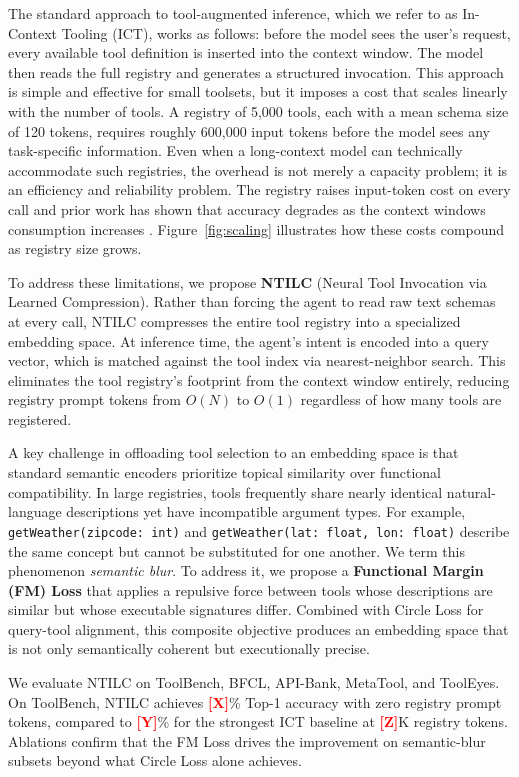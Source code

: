 \documentclass{article}
\newcommand{\placeholder}[1]{\textcolor{red}{\textbf{[#1]}}}
\begin{document}
The standard approach to tool-augmented inference, which we refer to as In-Context Tooling (ICT), works as follows: before the model sees the user's request, every available tool definition is inserted into the context window.
The model then reads the full registry and generates a structured invocation.
This approach is simple and effective for small toolsets, but it imposes a cost that scales linearly with the number of tools.
A registry of 5,000 tools, each with a mean schema size of 120 tokens, requires roughly 600,000 input tokens before the model sees any task-specific information.
Even when a long-context model can technically accommodate such registries, the overhead is not merely a capacity problem; it is an efficiency and reliability problem.
The registry raises input-token cost on every call and prior work has shown that accuracy degrades as the context windows consumption increases \cite{liu2023lostmiddlelanguagemodels}.
Figure~\ref{fig:scaling} illustrates how these costs compound as registry size grows.

To address these limitations, we propose \textbf{NTILC} (Neural Tool Invocation via Learned Compression).
Rather than forcing the agent to read raw text schemas at every call, NTILC compresses the entire tool registry into a specialized embedding space.
At inference time, the agent's intent is encoded into a query vector, which is matched against the tool index via nearest-neighbor search.
This eliminates the tool registry's footprint from the context window entirely, reducing registry prompt tokens from $O(N)$ to $O(1)$ regardless of how many tools are registered.

A key challenge in offloading tool selection to an embedding space is that standard semantic encoders prioritize topical similarity over functional compatibility.
In large registries, tools frequently share nearly identical natural-language descriptions yet have incompatible argument types.
For example, \texttt{getWeather(zipcode: int)} and \texttt{getWeather(lat: float, lon: float)} describe the same concept but cannot be substituted for one another.
We term this phenomenon \textit{semantic blur}.
To address it, we propose a \textbf{Functional Margin (FM) Loss} that applies a repulsive force between tools whose descriptions are similar but whose executable signatures differ.
Combined with Circle Loss for query-tool alignment, this composite objective produces an embedding space that is not only semantically coherent but executionally precise.

We evaluate NTILC on ToolBench, BFCL, API-Bank, MetaTool, and ToolEyes.
On ToolBench, NTILC achieves \placeholder{X}\% Top-1 accuracy with zero registry prompt tokens, compared to \placeholder{Y}\% for the strongest ICT baseline at \placeholder{Z}K registry tokens.
Ablations confirm that the FM Loss drives the improvement on semantic-blur subsets beyond what Circle Loss alone achieves.
\end{document}
